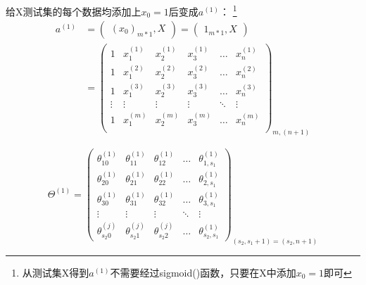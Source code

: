 给X测试集的每个数据均添加上$x_0 = 1$后变成$a^{(1)}$：
\footnote{从测试集X得到$a^{(1)}$不需要经过sigmoid()函数，只要在X中添加$x_0 = 1$即可}
\begin{equation}\begin{aligned}
	a^{(1)} &= \left(\begin{matrix} (x_0)_{m*1}, X\end{matrix}\right) = \left(\begin{matrix} 1_{m*1}, X\end{matrix}\right)
	\\ & = \left(\begin{matrix}
		1 & x_1^{(1)} & x_2^{(1)} & x_3^{(1)} & \dots & x_n^{(1)} \\
		1 & x_1^{(2)} & x_2^{(2)} & x_3^{(2)} & \dots & x_n^{(2)} \\
		1 & x_1^{(3)} & x_2^{(3)} & x_3^{(3)} & \dots & x_n^{(3)} \\
		\vdots        & \vdots    & \vdots    & \vdots    & \ddots & \vdots   \\
		1 & x_1^{(m)} & x_2^{(m)} & x_3^{(m)} & \dots & x_n^{(m)} \\
	\end{matrix}\right)_{m,(n+1)}
\end{aligned}\end{equation}

\begin{equation}
\Theta^{(1)} = 
	\left(\begin{matrix}
		\theta_{10}^{(1)} & \theta_{11}^{(1)} & \theta_{12}^{(1)} & \dots & \theta_{1,s_1}^{(1)} \\
		\theta_{20}^{(1)} & \theta_{21}^{(1)} & \theta_{22}^{(1)} & \dots & \theta_{2,s_1}^{(1)} \\
		\theta_{30}^{(1)} & \theta_{31}^{(1)} & \theta_{32}^{(1)} & \dots & \theta_{3,s_1}^{(1)} \\
		\vdots    & \vdots    & \vdots    & \ddots & \vdots   \\
		\theta_{s_{2}0}^{(j)} & \theta_{s_{2}1}^{(j)} & \theta_{s_{2}2}^{(j)} & \dots & \theta_{s_{2},s_{1}}^{(1)}
	\end{matrix}\right)_{(s_{2},s_1+1)=(s_{2},n+1)}
\end{equation}

